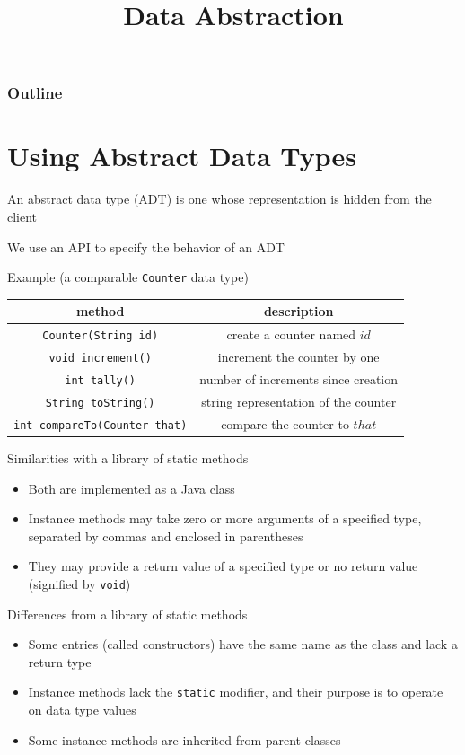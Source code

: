 \documentclass[8pt,a4paper,compress]{beamer}
\title{Data Abstraction}
\date{}
\begin{document}
\begin{frame}
\vfill
\titlepage
\end{frame}

\begin{frame}
\frametitle{Outline}
\tableofcontents
\end{frame}

\section{Using Abstract Data Types}
\begin{frame}[fragile]
\pause

An abstract data type (ADT) is one whose representation is hidden from the client

\pause
\bigskip

We use an API to specify the behavior of an ADT

\pause
\bigskip

Example (a comparable \lstinline{Counter} data type)
\begin{center}
\begin{tabular}{cc}
method & description \\ \hline
\lstinline$Counter(String id)$ & create a counter named $id$ \\
\lstinline$void increment()$ & increment the counter by one \\
\lstinline$int tally()$ & number of increments since creation \\
\lstinline$String toString()$ & string representation of the counter \\
\lstinline$int compareTo(Counter that)$ & compare the counter to $that$
\end{tabular} 
\end{center}
\end{frame}

\begin{frame}[fragile]
\pause

Similarities with a library of static methods
\begin{itemize}
\item Both are implemented as a Java class
\item Instance methods may take zero or more arguments of a specified type, separated by commas and enclosed in parentheses
\item They may provide a return value of a specified type or no return value (signified by \lstinline{void})
\end{itemize}

\pause
\bigskip

Differences from a library of static methods
\begin{itemize}
\item Some entries (called constructors) have the same name as the class and lack a return type
\item Instance methods lack the \lstinline{static} modifier, and their purpose is to operate on data type values
\item Some instance methods are inherited from parent classes
\end{itemize}
\end{frame}
\end{document}
